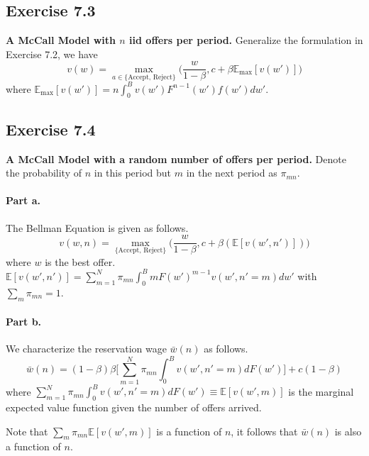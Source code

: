 \documentclass[11pt]{article}
\theoremstyle{definition}
\theoremstyle{boldtitle} %
\numberwithin{equation}{section}
\numberwithin{figure}{section}
\numberwithin{table}{section}
\begin{document}
\subsection{Exercise 7.3}
\textbf{A McCall Model with $n$ iid offers per period.}
Generalize the formulation in Exercise 7.2, we have
\begin{equation}
    v(w) = \max_{a \in \{\text{Accept, Reject} \} }  \bigg( \frac{w}{1 - \beta}, c + \beta \mathbb{E}_{\max} [v(w')] \bigg)
\end{equation}
where $\mathbb{E}_{\max} [v(w')] = n \int_{0}^B v(w') F^{n-1}(w')f(w') dw'$.


\subsection{Exercise 7.4}
\textbf{A McCall Model with a random number of offers per period.}
Denote the probability of $n$ in this period but $m$ in the next period as $\pi_{mn}$.

\paragraph{Part a.} The Bellman Equation is given as follows.
\begin{equation}
  v(w,n) = \max_{\text{\{Accept, Reject\}}} \bigg(\frac{w}{1 - \beta}, c + \beta(\mathbb{E}[v(w',n')]) \bigg)
\end{equation}
where $w$ is the best offer.
$\mathbb{E}[v(w',n')] = \sum_{m=1}^N \pi_{mn} \int_{0}^{B} m F(w')^{m-1}v(w', n' = m) dw'$ with $\sum_m \pi_{mn} = 1$.

\paragraph{Part b.} We characterize the reservation wage $\bar{w}(n)$ as follows.
\begin{equation}
  \bar{w}(n) = (1 - \beta)\beta \bigg[ \sum_{m=1}^N \pi_{mn} \int_{0}^{B} v(w', n'=m) dF(w')\bigg] + c(1-\beta)
\end{equation}
where $\sum_{m=1}^N \pi_{mn} \int_{0}^{B} v(w', n'=m) dF(w') \equiv \mathbb{E}[v(w', m)]$ is the marginal expected value function given the number of offers arrived.

Note that $\sum_m \pi_{mn} \mathbb{E}[v(w', m)]$ is a function of $n$, it follows that $\bar{w}(n)$ is also a function of $n$.
\end{document}
